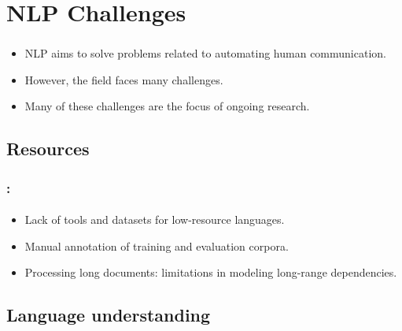 \documentclass[xcolor=table]{beamer}
\begin{document}
\section{NLP Challenges}

\begin{frame}
	\frametitle{\insertshortsubtitle}
	\framesubtitle{\insertsection}
	
	\begin{itemize}
		\item NLP aims to solve problems related to automating human communication.
		\item However, the field faces many challenges.
		\item Many of these challenges are the focus of ongoing research.
	\end{itemize}
	
	
\end{frame}

\subsection{Resources}

\begin{frame}
	\frametitle{\insertshortsubtitle: \insertsection}
	\framesubtitle{\insertsubsection}

	\begin{itemize}
		\item Lack of tools and datasets for low-resource languages.
		\item Manual annotation of training and evaluation corpora.
		\item Processing long documents: limitations in modeling long-range dependencies.
	\end{itemize}
	
\end{frame}

\subsection{Language understanding}
\end{document}
